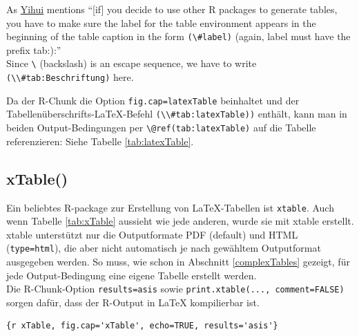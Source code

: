 \documentclass[]{book}
\theoremstyle{definition}
\theoremstyle{definition}
\theoremstyle{remark}
\begin{document}
As \href{https://bookdown.org/yihui/bookdown/tables.html}{Yihui}
mentions ``{[}if{]} you decide to use other R packages to generate
tables, you have to make sure the label for the table environment
appears in the beginning of the table caption in the form
\texttt{(\textbackslash{}\#label)} (again, label must have the prefix
tab:):''\\
Since \texttt{\textbackslash{}} (backslash) is an escape sequence, we
have to write
\texttt{(\textbackslash{}\textbackslash{}\#tab:Beschriftung)} here.

Da der R-Chunk die Option
\texttt{fig.cap=\textquotesingle{}latexTable\textquotesingle{}}
beinhaltet und der Tabellenüberschrifts-LaTeX-Befehl
\texttt{(\textbackslash{}\textbackslash{}\#tab:latexTable))} enthält,
kann man in beiden Output-Bedingungen per
\texttt{\textbackslash{}@ref(tab:latexTable)} auf die Tabelle
referenzieren: Siehe Tabelle \ref{tab:latexTable}.

\subsection{xTable()}\label{xTable}

Ein beliebtes R-package zur Erstellung von LaTeX-Tabellen ist
\texttt{xtable}. Auch wenn Tabelle \ref{tab:xTable} aussieht wie jede
anderen, wurde sie mit xtable erstellt.\\
xtable unterstützt nur die Outputformate PDF (default) und HTML
(\texttt{type=\textquotesingle{}html\textquotesingle{}}), die aber nicht
automatisch je nach gewähltem Outputformat ausgegeben werden. So muss,
wie schon in Abschnitt \ref{complexTables} gezeigt, für jede
Output-Bedingung eine eigene Tabelle erstellt werden.\\
Die R-Chunk-Option
\texttt{results=\textquotesingle{}asis\textquotesingle{}} sowie
\texttt{print.xtable(...,\ comment=FALSE)} sorgen dafür, dass der
R-Output in LaTeX kompilierbar ist.

\begin{verbatim}
{r xTable, fig.cap='xTable', echo=TRUE, results='asis'}
\end{verbatim}
\end{document}
